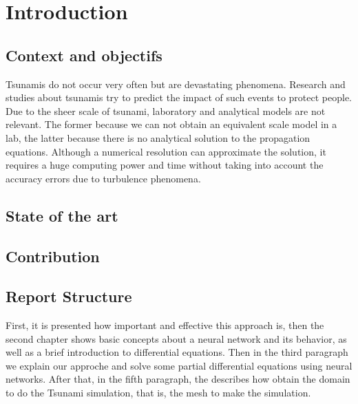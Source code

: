 \chapter{Introduction }\label{ch:Introduction}
\section{Context and objectifs}\label{sec:Contexte}
Tsunamis do not occur very often but are devastating phenomena. Research
and studies about tsunamis try to predict the impact of such events to protect
people. Due to the sheer scale of tsunami, laboratory and analytical models are
not relevant. The former because we can not obtain an equivalent scale model
in a lab, the latter because there is no analytical solution to the propagation
equations. Although a numerical resolution can approximate the solution, it
requires a huge computing power and time without taking into account the accuracy errors due to turbulence phenomena. 

\section{State of the art}\label{sec:Contexte}



\section{Contribution}\label{sec:Contribution}


\section{Report Structure}\label{sec:Contribution}
First, it is presented how important and effective this approach is, then
the second chapter shows basic concepts about a neural network and its behavior, as well as a brief introduction to differential equations.
Then in the third paragraph we explain our approche and solve some partial differential equations using neural networks.
After that, in the fifth paragraph, the describes how obtain the domain to do the Tsunami simulation, that is, the mesh to make the simulation.
